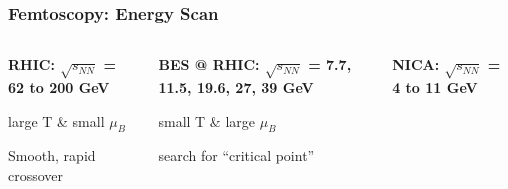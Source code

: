 \documentclass[dvipsnames] {beamer}
\begin{document}
\begin{frame}
  \frametitle{Femtoscopy: Energy Scan}
  \begin{columns}
    \begin{block}{}
      \footnotesize{
        \begin{center}
          \bf
          RHIC: $\sqrt{s_{NN}}$ = 62 to 200 GeV
          
          \vspace{0.15cm}
          
          \alert {large T \& small $\mu_{B}$}

          \vspace{0.15cm}
          

          \vspace{0.15cm}
          
          \alert {Smooth, rapid crossover}

        \end{center}
      }
    \end{block}
    
    \begin{block}{}
      \footnotesize{
        \begin{center}
          \bf
         BES @ RHIC: $\sqrt{s_{NN}}$ = 7.7, 11.5, 19.6, 27, 39 GeV

        \vspace{0.2cm}
        
        \alert {small T \& large $\mu_{B}$}

        \vspace{0.15cm}
        

        \vspace{0.15cm}
      
        \alert{search for ``critical point''}
         \end{center}
      }
    \end{block}
    \begin{block}{}
      \footnotesize{
        \begin{center}
          \bf
          NICA: $\sqrt{s_{NN}}$ = 4 to 11 GeV

           \vspace{0.15cm}
        

\end{center}}
\end{block}
\end{columns}
\end{frame}
\end{document}
